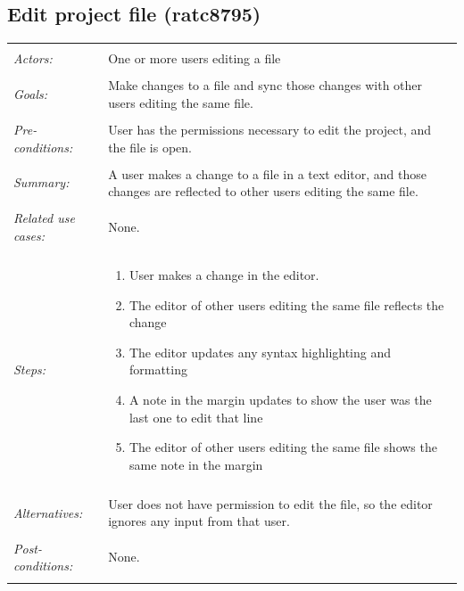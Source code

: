 \documentclass[11pt]{report}
\begin{document}
\begin{IDE-like Features}
\begin{}
\begin{Collaborative features that would be "nice":}
\subsection{Edit project file (ratc8795)}
\begin{tabular}{ p{2cm} p{12cm} }
 \hline
 \\
 \textit{Actors:} & One or more users editing a file \\ 
 \\
 \textit{Goals:} & Make changes to a file and sync those changes with other users editing the same file. \\
 \\
 \textit{Pre-conditions:} & User has the permissions necessary to edit the project, and the file is open.\\
 \\
 \textit{Summary:} & A user makes a change to a file in a text editor, and those changes are reflected to other users editing the same file. \\ 
 \\
 \textit{Related use cases:} & None. \\ 
 \\
 \textit{Steps:} & \begin{enumerate}
  \item User makes a change in the editor.
  \item The editor of other users editing the same file reflects the change
  \item The editor updates any syntax highlighting and formatting
  \item A note in the margin updates to show the user was the last one to edit that line
  \item The editor of other users editing the same file shows the same note in the margin
 \end{enumerate} \\
 \\
 \textit{Alternatives:} & User does not have permission to edit the file, so the editor ignores any input from that user. \\
 \\
 \textit{Post-conditions:} & None. \\
 \\
\hline
\end{tabular}


\end{Collaborative features that would be "nice":}
\end{}
\end{IDE-like Features}
\end{document}
